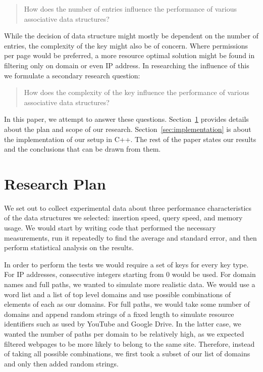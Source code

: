 \documentclass[12pt,a4paper]{article}
\begin{document}
    \begin{quotation}
        How does the number of entries influence the performance of various associative data
        structures?
    \end{quotation}

    While the decision of data structure might mostly be dependent on the number of entries, the
    complexity of the key might also be of concern. Where permissions per page would be preferred, a
    more resource optimal solution might be found in filtering only on domain or even IP address.  In
    researching the influence of this we formulate a secondary research question:

    \begin{quotation}
        How does the complexity of the key influence the performance of various associative data structures?
    \end{quotation}

    In this paper, we attempt to answer these questions. Section~\ref{sec:plan} provides details
    about the plan and scope of our research. Section~\ref{sec:implementation} is about the
    implementation of our setup in C++.  The rest of the paper states our results and the
    conclusions that can be drawn from them.


    \section{Research Plan}
    \label{sec:plan}

    We set out to collect experimental data about three performance characteristics of the data
    structures we selected: insertion speed, query speed, and memory usage.  We would start by
    writing code that performed the necessary measurements, run it repeatedly to find the average
    and standard error, and then perform statistical analysis on the results.

    In order to perform the tests we would require a set of keys for every key type.  For IP
    addresses, consecutive integers starting from 0 would be used.  For domain names and full paths,
    we wanted to simulate more realistic data.  We would use a word list and a list of top level
    domains and use possible combinations of elements of each as our domains.  For full paths, we
    would take some number of domains and append random strings of a fixed length to simulate
    resource identifiers such as used by YouTube and Google Drive.  In the latter case, we wanted
    the number of paths per domain to be relatively high, as we expected filtered webpages to be
    more likely to belong to the same site.  Therefore, instead of taking all possible combinations,
    we first took a subset of our list of domains and only then added random strings.
\end{document}
